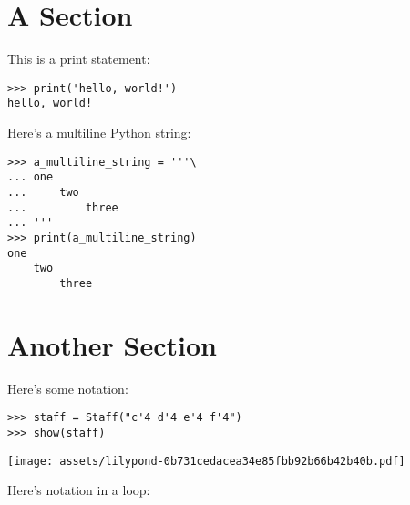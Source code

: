 \documentclass{article}
\begin{document}
\section{A Section}

This is a print statement:

\begin{comment}
<abjad>
print('hello, world!')
</abjad>
\end{comment}

\begin{lstlisting}
>>> print('hello, world!')
hello, world!
\end{lstlisting}

Here's a multiline Python string:

\begin{comment}
<abjad>
a_multiline_string = '''\
one
    two
        three
'''
print(a_multiline_string)
</abjad>
\end{comment}

\begin{lstlisting}
>>> a_multiline_string = '''\
... one
...     two
...         three
... '''
>>> print(a_multiline_string)
one
    two
        three
\end{lstlisting}

\section{Another Section}

Here's some notation:

\begin{comment}
<abjad>
staff = Staff("c'4 d'4 e'4 f'4")
show(staff)
</abjad>
\end{comment}

\begin{lstlisting}
>>> staff = Staff("c'4 d'4 e'4 f'4")
>>> show(staff)
\end{lstlisting}
\noindent\texttt{[image: assets/lilypond-0b731cedacea34e85fbb92b66b42b40b.pdf]}

Here's notation in a loop:

\begin{comment}
<abjad>
for leaf in iterate(staff).by_leaf():
    duration = inspect(leaf).get_duration()
    print(duration)
    show(leaf)

</abjad>
\end{comment}
\end{document}
